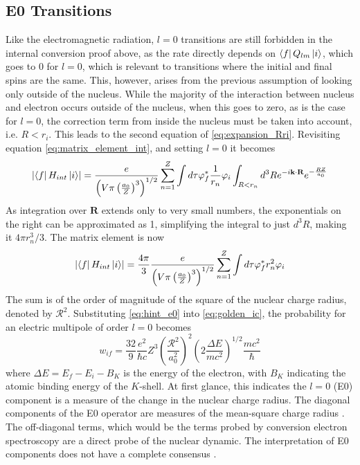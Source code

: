 \subsection{E0 Transitions}
\label{sec:E0}

Like the electromagnetic radiation, $l=0$ transitions are still forbidden in the internal conversion proof above, as the rate directly depends on $\bra{f}Q_{lm}\ket{i}$, which goes to 0 for $l=0$, which is relevant to transitions where the initial and final spins are the same. This, however, arises from the previous assumption of looking only outside of the nucleus. While the majority of the interaction between nucleus and electron occurs outside of the nucleus, when this goes to zero, as is the case for $l=0$, the correction term from inside the nucleus must be taken into account, i.e. $R<r_i$. This leads to the second equation of \ref{eq:expansion_Rri}. Revisiting equation \ref{eq:matrix_element_int}, and setting $l=0$ it becomes
\begin{equation}
\label{eq:matrix_element_E0}
    \abs{\bra{f}H_{int}\ket{i}} = \frac{e}{\left(V\pi\left(\frac{a_0}{Z}\right)^3\right)^{1/2}}\sum_{n=1}^Z \int d\tau\varphi_{f}^*\frac{1}{r_n}\varphi_{i} \int_{R<r_n}d^3R e^{-i\textbf{k}\cdot\textbf{R}} e^{-\frac{RZ}{a_0}}
\end{equation}
As integration over $\textbf{R}$ extends only to very small numbers, the exponentials on the right can be approximated as 1, simplifying the integral to just $d^3R$, making it $4\pi r_n^3/3$. The matrix element is now
\begin{equation}
\label{eq:hint_e0}
    \abs{\bra{f}H_{int}\ket{i}} =  \frac{4\pi}{3}\frac{e}{\left(V\pi\left(\frac{a_0}{Z}\right)^3\right)^{1/2}} \sum_{n=1}^Z \int d\tau\varphi_{f}^*r_n^2\varphi_{i}
\end{equation}
The sum is of the order of magnitude of the square of the nuclear charge radius, denoted by $\mathcal{R}^2$. Substituting \ref{eq:hint_e0} into \ref{eq:golden_ic}, the probability for an electric multipole of order $l=0$ becomes
\begin{equation}
    w_{if} = \frac{32}{9}\frac{e^2}{\hbar c}Z^3\left(\frac{\mathcal{R}^2}{a_0^2}\right)^2\left(2\frac{\Delta E}{mc^2}\right)^{1/2}\frac{mc^2}{\hbar}
\end{equation}
where $\Delta E=E_f-E_i-B_K$ is the energy of the electron, with $B_K$ indicating the atomic binding energy of the $K$-shell. At first glance, this indicates the $l=0$ (E0) component is a measure of the change in the nuclear charge radius. The diagonal components of the E0 operator are measures of the mean-square charge radius \citep{wood99:_e0}. The off-diagonal terms, which would be the terms probed by conversion electron spectroscopy are a direct probe of the nuclear dynamic. The interpretation of E0 components does not have a complete consensus \citep{ilie11:_deformed}.

